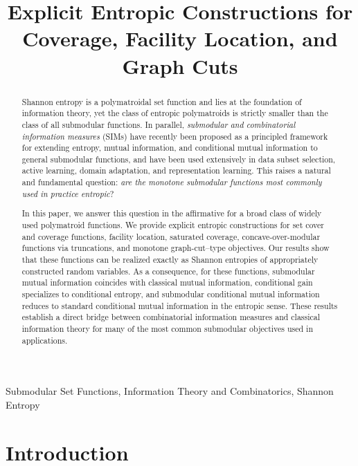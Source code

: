 \documentclass[conference]{IEEEtran}
\title{Explicit Entropic Constructions for Coverage, Facility Location, and Graph Cuts}
\author{
\IEEEauthorblockN{Rishabh Iyer}
\IEEEauthorblockA{
Computer Science Department\\
The University of Texas at Dallas\\
Richardson, TX, USA\\
rishabh.iyer@utdallas.edu
}
}
\theoremstyle{definition}
\theoremstyle{remark}
\begin{document}
\maketitle

\begin{abstract}
Shannon entropy is a polymatroidal set function and lies at the foundation of information theory, yet the class of entropic polymatroids is strictly smaller than the class of all submodular functions.
In parallel, \emph{submodular and combinatorial information measures} (SIMs) have recently been proposed as a principled framework for extending entropy, mutual information, and conditional mutual information to general submodular functions, and have been used extensively in data subset selection, active learning, domain adaptation, and representation learning.
This raises a natural and fundamental question: \emph{are the monotone submodular functions most commonly used in practice entropic}?

In this paper, we answer this question in the affirmative for a broad class of widely used polymatroid functions.
We provide explicit entropic constructions for set cover and coverage functions, facility location, saturated coverage, concave-over-modular functions via truncations, and monotone graph-cut–type objectives.
Our results show that these functions can be realized exactly as Shannon entropies of appropriately constructed random variables.
As a consequence, for these functions, submodular mutual information coincides with classical mutual information, conditional gain specializes to conditional entropy, and submodular conditional mutual information reduces to standard conditional mutual information in the entropic sense.
These results establish a direct bridge between combinatorial information measures and classical information theory for many of the most common submodular objectives used in applications.
\end{abstract}
\begin{IEEEkeywords}
Submodular Set Functions, Information Theory and Combinatorics, Shannon Entropy
\end{IEEEkeywords}

\section{Introduction}
\end{document}
